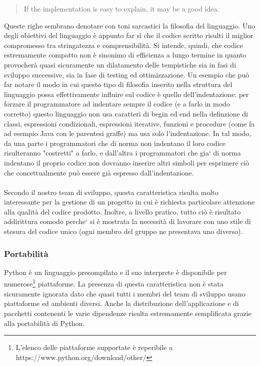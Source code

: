 \documentclass[12pt]{scrartcl}
\begin{document}
\begin{quotation}
If the implementation is easy to explain, it may be a good idea.
\end{quotation}
Queste righe sembrano denotare con toni sarcastici la filosofia del linguaggio.
Uno degli obiettivi del linguaggio \`e appunto far s\`i che il codice scritto
risulti il miglior compromesso tra stringatezza e comprensibilit\`a. Si intende,
quindi, che codice estremamente compatto non \`e sinonimo di efficienza a lungo termine
in quanto provocher\`a quasi sicuramente un dilatamento delle tempistiche
sia in fasi di sviluppo successive, sia in fase di testing ed ottimizzazione.
Un esempio che pu\`o far notare il modo in cui questo tipo di filosofia inserito
nella struttura del linguaggio possa effettivamente influire sul codice \`e 
quello dell'indentazione: per forzare il programmatore ad indentare sempre
il codice (e a farlo in modo corretto) questo linguaggio non usa caratteri
di begin ed end nella definzione di classi, espressioni condizionali,
espressioni iterative, funzioni e procedure (come fa ad esempio Java con le
parentesi graffe) ma usa solo l'indentazione. In tal modo, da una parte i programmatori
che di norma non indentano il loro codice risulteranno "costretti" a farlo,
e dall'altra i programmatori che gia` di norma indentano il proprio codice
non dovranno inserire altri simboli per esprimere ci\`o che concettualmente
pu\`o essere gi\`a espresso dall'indentazione. \\ \\
Secondo il nostro team di sviluppo, questa caratteristica risulta molto
interessante per la gestione di un progetto in cui \`e richiesta
particolare attenzione alla qualit\`a del codice prodotto. Inoltre, a livello
pratico, tutto ci\`o \`e risultato addirittura comodo perche` si \`e mostrata la
necessit\`a di lavorare con uno stile di stesura del codice unico (ogni membro
del gruppo ne presentava uno diverso).

\subsubsection{Portabilit\`a}
Python \`e un linguaggio precompilato e il suo interprete \`e disponibile per
numerose\footnote{L'elenco delle piattaforme supportate \`e reperibile a https://www.python.org/download/other/} piattaforme. 
La presenza di questa caratteristica non \`e stata sicuramente
ignorata dato che quasi tutti i membri del team di sviluppo usano piattaforme ed ambienti
diversi. Anche la distribuzione dell'applicazione e di pacchetti contenenti le 
varie dipendenze risulta estremamente semplificata grazie alla portabilit\`a di Python.
\end{document}
